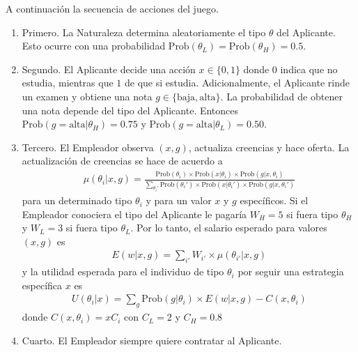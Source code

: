 \documentclass[11pt]{article}
\begin{document}
A continuaci\'on la secuencia de acciones del juego.
\begin{enumerate}
	\item Primero. La Naturaleza determina aleatoriamente el tipo $\theta$ del Aplicante. Esto ocurre con una probabilidad $\text{Prob}(\theta_{L}) = \text{Prob}(\theta_{H}) = 0.5$.
	\item Segundo. El Aplicante decide una acci\'on $x \in \{0, 1\}$ donde $0$ indica que no estudia, mientras que $1$ de que si estudia. Adicionalmente, el Aplicante rinde un examen y obtiene una nota $g \in \{\text{baja}, \text{alta}\}$. La probabilidad de obtener una nota depende del tipo del Aplicante. Entonces $\text{Prob}(g = \text{alta}|\theta_{H}) = 0.75$ y $\text{Prob}(g = \text{alta}|\theta_{L}) = 0.50$.
	\item Tercero. El Empleador observa $(x,g)$, actualiza creencias y hace oferta. La actualizaci\'on de creencias se hace de acuerdo a
	\begin{align*}
		\mu(\theta_{i}| x,g) = \frac{ \text{Prob}(\theta_{i}) \times \text{Prob}(x|\theta_{i}) \times \text{Prob}(g|x,\theta_{i}) }{ \sum_{\theta_{i}'} \text{Prob}(\theta_{i}') \times \text{Prob}(x|\theta_{i}') \times \text{Prob}(g|x,\theta_{i}')   }
	\end{align*} para un determinado tipo $\theta_{i}$ y para un valor $x$ y $g$ espec\'ificos. Si el Empleador conociera el tipo del Aplicante le pagar\'ia $W_{H} = 5$ si fuera tipo $\theta_{H}$ y $W_{L} = 3$ si fuera tipo $\theta_{L}$. Por lo tanto, el salario esperado para valores $(x,g)$ es 
	\begin{align*}
		E(w|x,g) = \sum_{i'} W_{i'} \times \mu( \theta_{i'}|x,g )
	\end{align*} y la utilidad esperada para el individuo de tipo $\theta_{i}$ por seguir una estrategia espec\'ifica $x$ es
	\begin{align*}
		U(\theta_{i}|x) = \sum_{g} \text{Prob}(g|\theta_{i}) \times E(w|x,g) - C(x,\theta_{i})
	\end{align*} donde $C(x,\theta_{i}) = x C_{i}$ con $C_{L} = 2$ y $C_{H} = 0.8$

	\item Cuarto. El Empleador siempre quiere contratar al Aplicante.
\end{enumerate}
\end{document}
